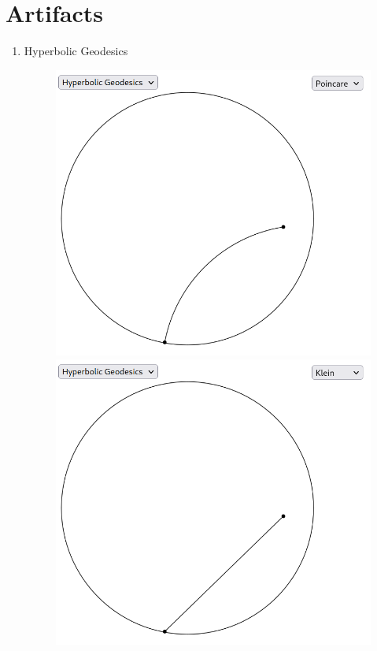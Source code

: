 \documentclass[12pt]{article}%
\begin{document}
\section{Artifacts}

\begin{enumerate}
	\item Hyperbolic Geodesics
		\begin{figure}[H]
			\centering
			\includegraphics[scale=0.25]{p_geodesic.png}
			\includegraphics[scale=0.25]{k_geodesic.png}

\end{figure}
\end{enumerate}
\end{document}
